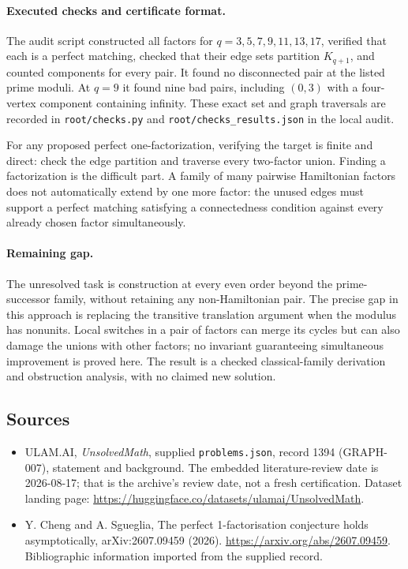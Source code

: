 \documentclass[11pt,a4paper]{article}
\begin{document}
\paragraph{Executed checks and certificate format.}
The audit script constructed all factors for $q=3,5,7,9,11,13,17$, verified that each is a perfect matching, checked that their edge sets partition $K_{q+1}$, and counted components for every pair. It found no disconnected pair at the listed prime moduli. At $q=9$ it found nine bad pairs, including $(0,3)$ with a four-vertex component containing infinity. These exact set and graph traversals are recorded in \texttt{root/checks.py} and \texttt{root/checks\_results.json} in the local audit.

For any proposed perfect one-factorization, verifying the target is finite and direct: check the edge partition and traverse every two-factor union. Finding a factorization is the difficult part. A family of many pairwise Hamiltonian factors does not automatically extend by one more factor: the unused edges must support a perfect matching satisfying a connectedness condition against every already chosen factor simultaneously.

\paragraph{Remaining gap.}
The unresolved task is construction at every even order beyond the prime-successor family, without retaining any non-Hamiltonian pair. The precise gap in this approach is replacing the transitive translation argument when the modulus has nonunits. Local switches in a pair of factors can merge its cycles but can also damage the unions with other factors; no invariant guaranteeing simultaneous improvement is proved here. The result is a checked classical-family derivation and obstruction analysis, with no claimed new solution.

\subsection{Sources}

{\small

\begin{itemize}

\item[\hypertarget{source:1394:1}{S1}] ULAM.AI, \emph{UnsolvedMath}, supplied \texttt{problems.json}, record 1394 (GRAPH-007), statement and background. The embedded literature-review date is 2026-08-17; that is the archive’s review date, not a fresh certification. Dataset landing page: \url{https://huggingface.co/datasets/ulamai/UnsolvedMath}.

\item[\hypertarget{source:1394:2}{S2}] Y. Cheng and A. Sgueglia, The perfect 1-factorisation conjecture holds asymptotically, arXiv:2607.09459 (2026). \url{https://arxiv.org/abs/2607.09459}. Bibliographic information imported from the supplied record.

\end{itemize}

}

\label{end:1394}
\end{document}
